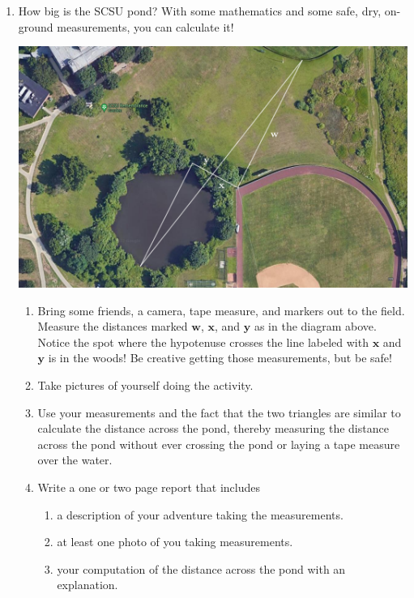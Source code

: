 \begin{enumerate}


\item How big is the SCSU pond? With some mathematics and some safe, dry, on-ground measurements, you can calculate it! 
\begin{center}
    \includegraphics[width=5.5in]{images/SCSU Pond}
\end{center}
\begin{enumerate}
\item Bring some friends, a camera, tape measure, and markers out to the field. Measure the distances marked $\mathbf w$, $\mathbf x$, and $\mathbf y$ as in the diagram above. Notice the spot where the hypotenuse crosses the line labeled with $\mathbf x$ and $\mathbf y$ is in the woods! Be creative getting those measurements, but be safe!
\item Take pictures of yourself doing the activity.
\item Use your measurements and the fact that the two triangles are similar to calculate the distance across the pond, thereby measuring the distance across the pond without ever crossing the pond or laying a tape measure over the water.
\item Write a one or two page report that includes
\begin{enumerate}
    \item a description of your adventure taking the measurements.
    \item at least one photo of you taking measurements.
    \item your computation of the distance across the pond with an explanation.
\end{enumerate}
\end{enumerate}
\wbnewpage



\end{enumerate}

